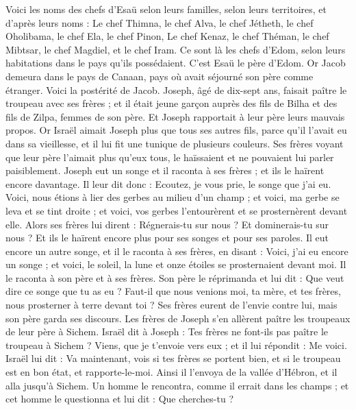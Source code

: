 \begin{multicols}{2}
Voici les noms des chefs d'Esaü selon leurs familles, selon leurs territoires, et d’après leurs noms : Le chef Thimna, le chef Alva, le chef Jétheth,
le chef Oholibama, le chef Ela, le chef Pinon,
Le chef Kenaz, le chef Théman, le chef Mibtsar,
le chef Magdiel, et le chef Iram. Ce sont là les chefs d'Edom, selon leurs habitations dans le pays qu’ils possédaient. C'est Esaü le père d'Edom.
\VerseOne{}Or Jacob demeura dans le pays de Canaan, pays où avait séjourné son père comme étranger.
Voici la postérité de Jacob. Joseph, âgé de dix-sept ans, faisait paître le troupeau avec ses frères ; et il était jeune garçon auprès des fils de Bilha et des fils de Zilpa, femmes de son père. Et Joseph rapportait à leur père leurs mauvais propos.
Or Israël aimait Joseph plus que tous ses autres fils, parce qu'il l'avait eu dans sa vieillesse, et il lui fit une tunique de plusieurs couleurs.
Ses frères voyant que leur père l'aimait plus qu'eux tous, le haïssaient et ne pouvaient lui parler paisiblement.
Joseph eut un songe et il raconta à ses frères ; et ils le haïrent encore davantage.
Il leur dit donc : Ecoutez, je vous prie, le songe que j'ai eu.
Voici, nous étions à lier des gerbes au milieu d'un champ ; et voici, ma gerbe se leva et se tint droite ; et voici, vos gerbes l’entourèrent et se prosternèrent devant elle.
Alors ses frères lui dirent : Régnerais-tu sur nous ? Et dominerais-tu sur nous ? Et ils le haïrent encore plus pour ses songes et pour ses paroles.
Il eut encore un autre songe, et il le raconta à ses frères, en disant : Voici, j'ai eu encore un songe ; et voici, le soleil, la lune et onze étoiles se prosternaient devant moi.
Il le raconta à son père et à ses frères. Son père le réprimanda et lui dit : Que veut dire ce songe que tu as eu ? Faut-il que nous venions moi, ta mère, et tes frères, nous prosterner à terre devant toi ?
Ses frères eurent de l'envie contre lui, mais son père garda ses discours.
Les frères de Joseph s'en allèrent paître les troupeaux de leur père à Sichem.
Israël dit à Joseph : Tes frères ne font-ils pas paître le troupeau à Sichem ? Viens, que je t'envoie vers eux ; et il lui répondit : Me voici.
Israël lui dit : Va maintenant, vois si tes frères se portent bien, et si le troupeau est en bon état, et rapporte-le-moi. Ainsi il l'envoya de la vallée d’Hébron, et il alla jusqu'à Sichem.
Un homme le rencontra, comme il errait dans les champs ; et cet homme le questionna et lui dit : Que cherches-tu ?

\end{multicols}
